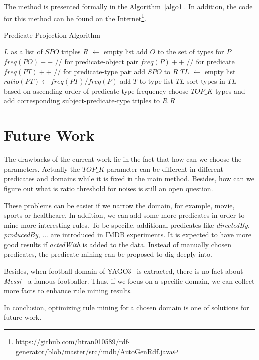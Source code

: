 \documentclass{acm_proc_article-sp}
\begin{document}
The method is presented formally in the Algorithm~\ref{algo1}. In addition, the code for this method can be found on the Internet\footnote{\url{https://github.com/htran010589/rdf-generator/blob/master/src/imdb/AutoGenRdf.java}}.

\begin{algorithm}[ht]
\caption{Predicate Projection Algorithm}
\label{algo1}
\begin{algorithmic}
\REQUIRE $L$ as a list of $SPO$ triples
\STATE $R$ $\leftarrow$ empty list
\STATE add $O$ to the set of types for $P$
\ENDIF
\STATE $freq(PO)++$  //  for predicate-object pair
\STATE $freq(P)++$  //  for predicate
\ENDFOR
\STATE
{}
\STATE $freq(PT)++$  //  for predicate-type pair
\ENDFOR
\ENDFOR
\STATE
{}
\STATE add $SPO$ to $R$
\ENDIF
\STATE
\STATE $TL$ $\leftarrow$ empty list
\STATE $ratio(PT) \leftarrow freq(PT) / freq(P)$
\STATE add $T$ to type list $TL$
\ENDIF
\ENDFOR
\STATE sort types in $TL$ based on ascending order of predicate-type frequency
\STATE choose $TOP\_K$ types and add corresponding subject-predicate-type triples to $R$
\ENDFOR
\STATE
\RETURN $R$
\end{algorithmic}
\end{algorithm}

\section{Future Work}

The drawbacks of the current work lie in the fact that how can we choose the parameters. Actually the $TOP\_K$ parameter can be different in different predicates and domains while it is fixed in the main method. Besides, how can we figure out what is ratio threshold for noises is still an open question.

These problems can be easier if we narrow the domain, for example, movie, sports or healthcare. In addition, we can add some more predicates in order to mine more interesting rules. To be specific, additional predicates like \textit{directedBy}, \textit{producedBy}, ... are introduced in IMDB experiments. It is expected to have more good results if \textit{actedWith} is added to the data. Instead of manually chosen predicates, the predicate mining can be proposed to dig deeply into.

Besides, when football domain of YAGO3~\cite{ref1} is extracted, there is no fact about \textit{Messi} - a famous footballer. Thus, if we focus on a specific domain, we can collect more facts to enhance rule mining results.

In conclusion, optimizing rule mining for a chosen domain is one of solutions for future work.



\end{document}
